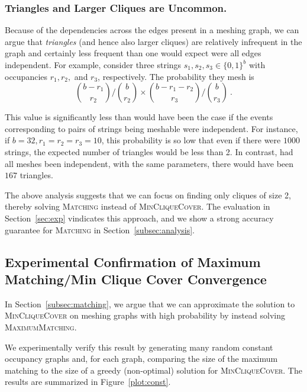 \subsubsection{Triangles and Larger Cliques are Uncommon.}
Because of the dependencies across the edges present in a meshing
graph, we can argue that \emph{triangles} (and hence also larger
cliques) are relatively infrequent in the graph and certainly less
frequent than one would expect were all edges independent.  For
example, consider three strings $s_1, s_2, s_3\in \{0,1\}^b$ with
occupancies $r_1, r_2,$ and $r_3$, respectively. The probability they
mesh is
\[
{\binom{b-r_1}{r_2}} \big / {\binom{b}{r_2}} \times {\binom{b-r_{1}-r_2 }{r_3}} \big / {\binom{b}{r_3}} \ . \]

This value is significantly less than would have been the case if the
events corresponding to pairs of strings being meshable were
independent.
For instance, if $b = 32, r_1=r_2=r_3 = 10$, this probability is so
low that even if there were $1000$ strings, the expected number of
triangles would be less than 2. In contrast, had all meshes been
independent, with the same parameters, there would have been $167$ triangles.

The above analysis suggests that we can focus on finding only cliques
of size 2, thereby solving \textsc{Matching} instead of
\textsc{MinCliqueCover}. The evaluation in
Section~\ref{sec:exp} vindicates this approach, and we show a
strong accuracy guarantee for \textsc{Matching} in Section~\ref{subsec:analysis}.

\subsection{Experimental Confirmation of Maximum Matching/Min Clique Cover Convergence}
\label{subsec:exp}

In Section~\ref{subsec:matching}, we argue that we can approximate the solution to \textsc{MinCliqueCover} on meshing graphs with high probability by instead solving \textsc{MaximumMatching}.

We experimentally verify this result by generating many random constant occupancy graphs and, for each graph, comparing the size of the maximum matching to the size of a greedy (non-optimal) solution for \textsc{MinCliqueCover}.  The results are summarized in Figure~\ref{plot:const}.

